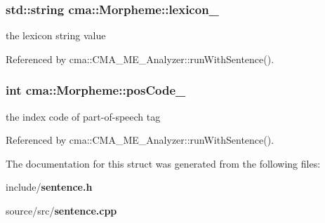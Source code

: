 \subsubsection[{lexicon\_\-}]{\setlength{\rightskip}{0pt plus 5cm}std::string {\bf cma::Morpheme::lexicon\_\-}}\label{structcma_1_1Morpheme_1054ad519e1ebb80ec71cd21b8ad2a78}


the lexicon string value 

Referenced by cma::CMA\_\-ME\_\-Analyzer::runWithSentence().
\subsubsection[{posCode\_\-}]{\setlength{\rightskip}{0pt plus 5cm}int {\bf cma::Morpheme::posCode\_\-}}\label{structcma_1_1Morpheme_883d0df2e303ce7bd5953bfa913a88ef}


the index code of part-of-speech tag 

Referenced by cma::CMA\_\-ME\_\-Analyzer::runWithSentence().

The documentation for this struct was generated from the following files:\begin{CompactItemize}
\item 
include/{\bf sentence.h}\item 
source/src/{\bf sentence.cpp}\end{CompactItemize}
